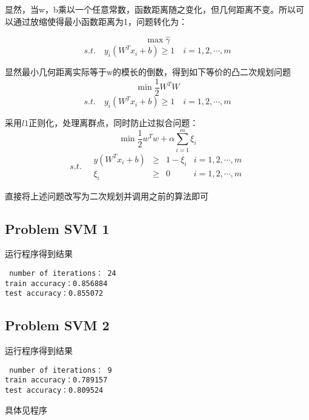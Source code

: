 \documentclass[11pt,a4paper]{article}
\begin{document}
显然，当w，b乘以一个任意常数，函数距离随之变化，但几何距离不变。所以可以通过放缩使得最小函数距离为1，问题转化为：

\[\max \hat{\gamma}\]
\[s.t.\quad y_i(W^Tx_i+b) \ge 1 \quad i=1,2,\cdots,m\]

显然最小几何距离实际等于w的模长的倒数，得到如下等价的凸二次规划问题
\[\min \frac{1}{2}W^TW \]
\[s.t.\quad y_i(W^Tx_i+b) \ge 1\quad i=1,2,\cdots,m \]

采用$l1$正则化，处理离群点，同时防止过拟合问题：
\[\min \frac{1}{2}w^Tw+\alpha\sum_{i=1}^{m}\xi_i \]
\[s.t.\quad\begin{array}{rclr}
y(W^Tx_i+b) & \ge & 1-\xi_i & i=1,2,\cdots,m\\
\xi_i & \ge & 0 & i=1,2,\cdots,m
\end{array}
\]

直接将上述问题改写为二次规划并调用之前的算法即可

\subsection{Problem SVM 1}

运行程序得到结果

\noindent\texttt{
number of iterations： 24\\
train accuracy：0.856884\\
test accuracy：0.855072	
}

\subsection{Problem SVM 2}

运行程序得到结果

\noindent\texttt{
number of iterations： 9\\
train accuracy：0.789157\\
test accuracy：0.809524
}

具体见程序
\end{document}
